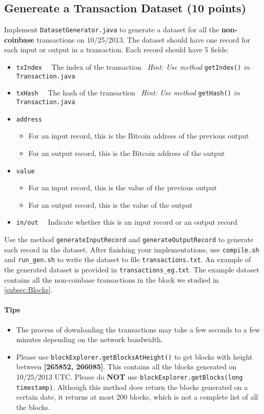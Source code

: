 \documentclass[letterpaper,12pt]{report}
\begin{document}
\subsection{Genereate a Transaction Dataset (10 points)} \label{subsec:gen}
Implement \texttt{DatasetGenerator.java} to generate a dataset for all the \textbf{non-coinbase} transactions on 10/25/2013. The dataset should have one record for each input or output in a transaction. Each record should have 5 fields: 
\begin{itemize}
	\item \texttt{txIndex} \ \ The index of the transaction \  \textit{Hint: Use method} \texttt{getIndex()} \textit{in} \texttt{Transaction.java}
	\item \texttt{txHash} \ \ The hash of the transaction \  \textit{Hint: Use method} \texttt{getHash()} \textit{in} \texttt{Transaction.java}
	\item \texttt{address}
		\begin{itemize}
			\item For an input record, this is the Bitcoin address of the previous output
			\item For an output record, this is the Bitcoin address of the output
		\end{itemize}
	\item \texttt{value}
		\begin{itemize}
			\item For an input record, this is the value of the previous output
			\item For an output record, this is the value of the output
		\end{itemize}
	\item \texttt{in/out} \ \ Indicate whether this is an input record or an output record
\end{itemize}
Use the method \texttt{generateInputRecord} and \texttt{generateOutputRecord} to generate each record in the dataset. After finishing your implementations, use \texttt{compile.sh} and \texttt{run\_gen.sh} to write the dataset to file \texttt{transactions.txt}. An example of the generated dataset is provided in \texttt{transactions\_eg.txt}. The example dataset contains all the non-coinbase transactions in the block we studied in \ref{subsec:Blocks}. 

\paragraph{Tips}
\begin{itemize}
	\item The process of downloading the transactions may take a few seconds to a few minutes depending on the network bandwidth.
	\item Please use \texttt{blockExplorer.getBlocksAtHeight()} to get blocks with height between \textbf{[265852, 266085]}. This contains all the blocks generated on 10/25/2013 UTC. Please do \textbf{NOT} use \texttt{blockExplorer.getBlocks(long timestamp)}. Although this method does return the blocks generated on a certain date, it returns at most 200 blocks, which is not a complete list of all the blocks.
\end{itemize}
\end{document}
